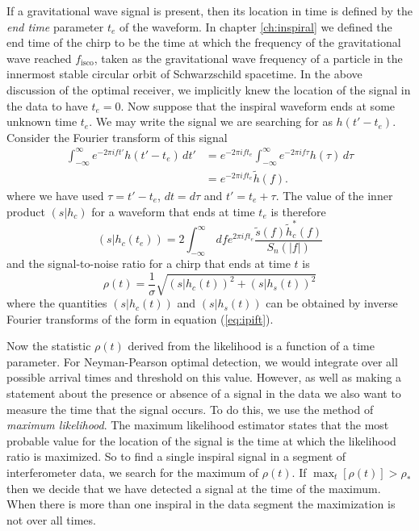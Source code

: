 If a gravitational wave signal is present, then its location in time is
defined by the \emph{end time} parameter $t_e$ of the waveform. In chapter
\ref{ch:inspiral} we defined the end time of the chirp to be the time at which
the frequency of the gravitational wave reached $f_\mathrm{isco}$, taken as the
gravitational wave frequency of a particle in the innermost stable circular
orbit of Schwarzschild spacetime.  In the above discussion of the optimal
receiver, we implicitly knew the location of the signal in the data to have
$t_e = 0$. Now suppose that the inspiral waveform ends at some unknown time
$t_e$. We may write the signal we are searching for as $h(t'-t_e)$. Consider
the Fourier transform of this signal
\begin{equation}
\begin{split}
\int_{-\infty}^\infty e^{-2\pi i f t'} h(t'-t_e) \, dt' &= 
e^{-2\pi ift_e} \int_{-\infty}^\infty e^{-2\pi i f \tau} h(\tau) \, d\tau \\
&= e^{-2\pi ift_e} \tilde{h}(f).
\end{split}
\end{equation}
where we have used $\tau = t' - t_e$, $dt = d\tau$ and $t' = t_e + \tau$.
The value of the inner product $(s|h_c)$ for a waveform that ends at time $t_e$ is
therefore
\begin{equation}
(s|h_c(t_e)) = 2 \int_{-\infty}^\infty\,df e^{2\pi ift_e}
\frac{\tilde{s}(f)\tilde{h}_c^\ast(f)}{S_n(|f|)}
\label{eq:ipift}
\end{equation}
and the signal-to-noise ratio for a chirp that ends at time $t$ is
\begin{equation}
\rho(t) = \frac{1}{\sigma} \sqrt{ (s|h_c(t))^2 + (s|h_s(t))^2}
\end{equation}
where the quantities $(s|h_c(t))$ and $(s|h_s(t))$ can be obtained by inverse
Fourier transforms of the form in equation (\ref{eq:ipift}).

Now the statistic $\rho(t)$ derived from the likelihood is a function of a
time parameter. For Neyman-Pearson optimal detection, we would integrate over
all possible arrival times and threshold on this value. However, as well as
making a statement about the presence or absence of a signal in the data we
also want to measure the time that the signal occurs. To do this, we use the
method of \emph{maximum likelihood}\cite{helstrom:1995}.  The maximum
likelihood estimator states that the most probable value for the location of
the signal is the time at which the likelihood ratio is maximized.  So to find
a single inspiral signal in a segment of interferometer data, we search for
the maximum of $\rho(t)$. If $\max_t\left[\rho(t)\right] > \rho_\ast$ then we
decide that we have detected a signal at the time of the maximum. When there
is more than one inspiral in the data segment the maximization is not over all
times.

